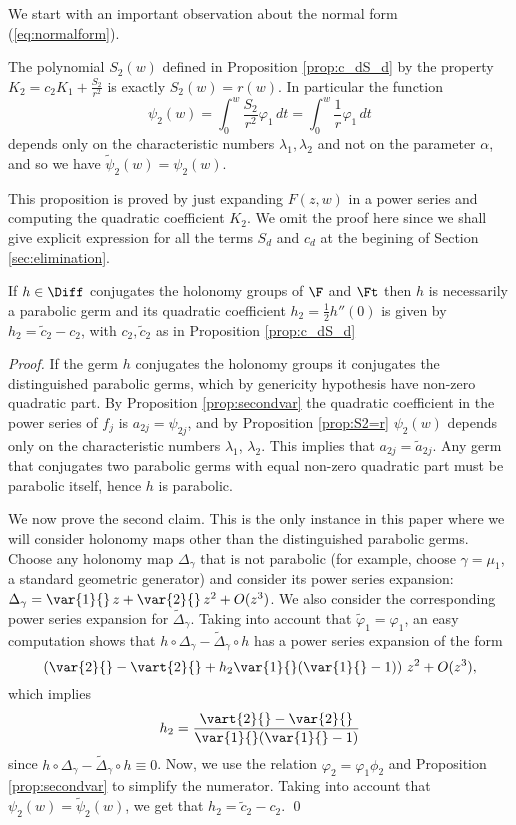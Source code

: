 We start with an important observation about the normal form (\ref{eq:normalform}).

\begin{proposition}\label{prop:S2=r}
 The polynomial $S_2(w)$ defined in Proposition \textnormal{\ref{prop:c_dS_d}} by the property $K_2=c_2K_1+\frac{S_2}{r^2}$ is exactly $S_2(w)=r(w)$. In particular the function  
\[ \psi_2(w)=\int_0^w\frac{S_2}{r^2}\varphi_1\,dt=\int_0^w\frac{1}{r}\varphi_1\,dt \]
depends only on the characteristic numbers $\lambda_1,\lambda_2$ and not on the parameter $\alpha$, and so we have $\tilde{\psi}_2(w)=\psi_2(w)$.
\end{proposition}

This proposition is proved by just expanding $F(z,w)$ in a power series and computing the quadratic coefficient $K_2$. We omit the proof here since we shall give explicit expression for all the terms $S_d$ and $c_d$ at the begining of Section \ref{sec:elimination}.

\begin{proposition}\label{prop:h2}
If $h\in\Diff$ conjugates the holonomy groups of $\F$ and $\Ft$ then $h$ is necessarily a parabolic germ and its quadratic coefficient $h_2=\frac{1}{2}h''(0)$ is given by $h_2=\tilde{c}_2-c_2$, with $c_2,\tilde{c}_2$ as in Proposition \textnormal{\ref{prop:c_dS_d}}
\end{proposition}

\begin{proof}
If the germ $h$ conjugates the holonomy groups it conjugates the distinguished parabolic germs, which by genericity hypothesis have non-zero quadratic part. By Proposition \ref{prop:secondvar} the quadratic coefficient in the power series of $f_j$ is $a_{2j}=\psi_{2j}$, and by Proposition \ref{prop:S2=r} $\psi_2(w)$ depends only on the characteristic numbers $\lambda_1$, $\lambda_2$. This implies that $a_{2j}=\tilde{a}_{2j}$. Any germ that conjugates two parabolic germs with equal non-zero quadratic part must be parabolic itself, hence $h$ is parabolic.

We now prove the second claim. This is the only instance in this paper where we will consider holonomy maps other than the distinguished parabolic germs. Choose any holonomy map $\Delta_\gamma$ that is not parabolic (for example, choose $\gamma=\mu_1$, a standard geometric generator) and consider its power series expansion: $\Delta_\gamma=\var{1}{}\,z+\var{2}{}\,z^2+O(z^3)$. We also consider the corresponding power series expansion for $\widetilde{\Delta}_\gamma$. Taking into account that $\widetilde{\varphi}_1=\varphi_1$, an easy computation shows that $h\circ\Delta_\gamma-\widetilde{\Delta}_\gamma\circ h$ has a power series expansion of the form
\[ \left(\var{2}{}-\vart{2}{}+h_2\var{1}{}(\var{1}{}-1)\right)\,z^2+O(z^3), \]
which implies
\[ h_2=\frac{\vart{2}{}-\var{2}{}}{\var{1}{}(\var{1}{}-1)} \]
since $h\circ\Delta_\gamma-\widetilde{\Delta}_\gamma\circ h\equiv 0$. Now, we use the relation $\varphi_2=\varphi_1\phi_2$ and Proposition \ref{prop:secondvar} to simplify the numerator. Taking into account that $\psi_2(w)=\tilde{\psi}_2(w)$, we get that $h_2=\tilde{c}_2-c_2$.
\qed\end{proof}

